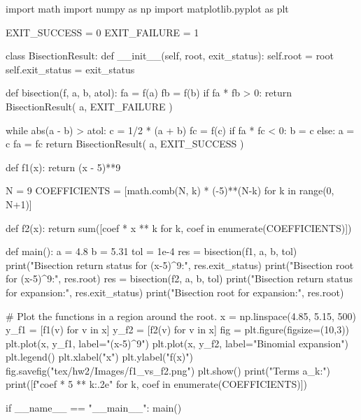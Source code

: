 \documentclass{homework}
\begin{document}
\begin{python}
import math
import numpy as np
import matplotlib.pyplot as plt

EXIT_SUCCESS = 0
EXIT_FAILURE = 1


class BisectionResult:
    def __init__(self, root, exit_status):
        self.root = root
        self.exit_status = exit_status


def bisection(f, a, b, atol):
    fa = f(a)
    fb = f(b)
    if fa * fb > 0:
        return BisectionResult(
            a, EXIT_FAILURE
        )

    while abs(a - b) > atol:
        c = 1/2 * (a + b)
        fc = f(c)
        if fa * fc < 0:
            b = c
        else:
            a = c
            fa = fc
    return BisectionResult(
        a, EXIT_SUCCESS
    )


def f1(x):
    return (x - 5)**9

N = 9
COEFFICIENTS = [math.comb(N, k) * (-5)**(N-k) for k in range(0, N+1)]

def f2(x):
    return sum([coef * x ** k for k, coef in enumerate(COEFFICIENTS)])


def main():
    a = 4.8
    b = 5.31
    tol = 1e-4
    res = bisection(f1, a, b, tol)
    print("Bisection return status for (x-5)^9:", res.exit_status)
    print("Bisection root for (x-5)^9:", res.root)
    res = bisection(f2, a, b, tol)
    print("Bisection return status for expansion:", res.exit_status)
    print("Bisection root for expansion:", res.root)

    # Plot the functions in a region around the root.
    x = np.linspace(4.85, 5.15, 500)
    y_f1 = [f1(v) for v in x]
    y_f2 = [f2(v) for v in x]
    fig = plt.figure(figsize=(10,3))
    plt.plot(x, y_f1, label="(x-5)^9")
    plt.plot(x, y_f2, label="Binomial expansion")
    plt.legend()
    plt.xlabel("x")
    plt.ylabel("f(x)")
    fig.savefig("tex/hw2/Images/f1_vs_f2.png")
    plt.show()
    print("Terms a_k:")
    print([f"{coef * 5 ** k:.2e}" for k, coef in enumerate(COEFFICIENTS)])




if __name__ == "__main__":
    main()

\end{python}
\end{document}
